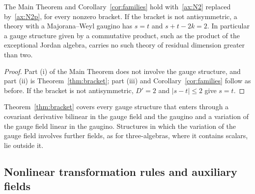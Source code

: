 \begin{corollary}
\label{cor:bracket}
The Main Theorem and Corollary~\ref{cor:families} hold with~\ref{ax:N2} replaced by~\ref{ax:N2p}, for every nonzero bracket. If the bracket is not antisymmetric, a theory with a Majorana--Weyl gaugino has $s=t$ and $s+t-2k=2$. In particular a gauge structure given by a commutative product, such as the product of the exceptional Jordan algebra, carries no such theory of residual dimension greater than two.
\end{corollary}

\begin{proof}
Part (i) of the Main Theorem does not involve the gauge structure, and part (ii) is Theorem~\ref{thm:bracket}; part (iii) and Corollary~\ref{cor:families} follow as before. If the bracket is not antisymmetric, $D'=2$ and $|s-t|\le2$ give $s=t$.
\end{proof}

Theorem~\ref{thm:bracket} covers every gauge structure that enters through a covariant derivative bilinear in the gauge field and the gaugino and a variation of the gauge field linear in the gaugino. Structures in which the variation of the gauge field involves further fields, as for three-algebras, where it contains scalars, lie outside it.

\subsection{Nonlinear transformation rules and auxiliary fields}
\label{ssec:nonlinear}

